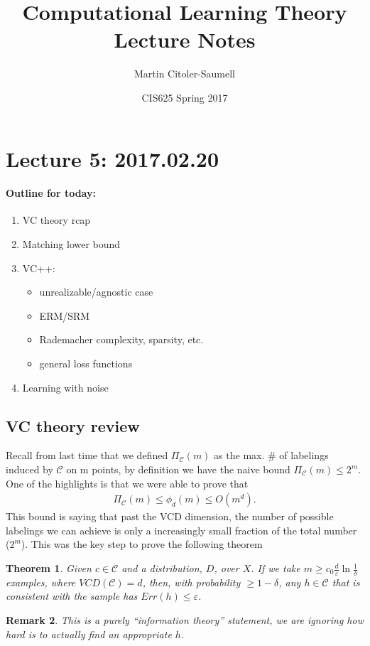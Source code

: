 \documentclass[12pt, letterpaper]{article}
\title{Computational Learning Theory Lecture Notes}
\author{Martin Citoler-Saumell}
\date{CIS625 Spring 2017}
\numberwithin{equation}{section} %
\newcommand{\mc}{\mathcal}
\newcommand{\ve}{\varepsilon}
\newtheorem{theorem}{Theorem}[section]
\newtheorem{remark}[theorem]{Remark}
\theoremstyle{definition}
\theoremstyle{remark}
\begin{document}
\section{Lecture 5: 2017.02.20}

\paragraph{Outline for today:}
\begin{enumerate}
\item VC theory rcap
\item Matching lower bound
\item VC++:
    \begin{itemize}
    \item unrealizable/agnostic case
    \item ERM/SRM
    \item Rademacher complexity, sparsity, etc.
    \item general loss functions
    \end{itemize}
\item Learning with noise
\end{enumerate}

\subsection{VC theory review}
Recall from last time that we defined $\Pi_{\mc C}(m)$ as the max. \# of labelings induced by $\mc C$ on m points, by definition we have the naive bound $\Pi_{\mc C}(m)\leq 2^m$. One of the highlights is that we were able to prove that
\begin{align}
 \Pi_{\mc C}(m) \leq \phi_d(m) \leq O(m^d).
\end{align}
This bound is saying that past the VCD dimension, the number of possible labelings we can achieve is only a increasingly small fraction of the total number ($2^m$). This was the key step to prove the following theorem
\begin{theorem}
    Given $c\in\mc C$ and a distribution, $D$, over $X$. If we take $m \geq c_0 \frac{d}\ve \ln \frac1\delta$ examples, where $VCD(\mc C)=d$, then, with probability $\geq 1-\delta$, any $h\in\mc C$ that is consistent with the sample has $Err(h)\leq \ve$.
\end{theorem}
\begin{remark}
    This is a purely ``information theory'' statement, we are ignoring how hard is to actually find an appropriate $h$.
\end{remark}
\end{document}
